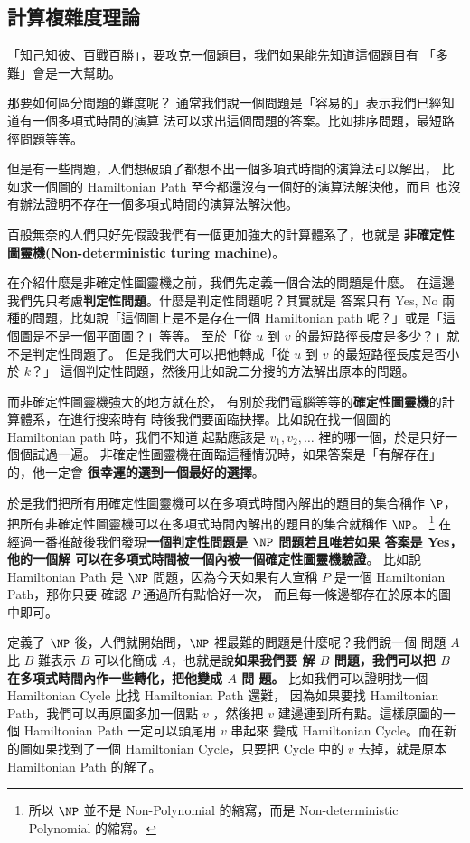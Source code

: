 \documentclass[a4paper,12pt]{book}
\begin{document}
\subsection{計算複雜度理論}
「知己知彼、百戰百勝」，要攻克一個題目，我們如果能先知道這個題目有
「多難」會是一大幫助。

那要如何區分問題的難度呢？
通常我們說一個問題是「容易的」表示我們已經知道有一個多項式時間的演算
法可以求出這個問題的答案。比如排序問題，最短路徑問題等等。

但是有一些問題，人們想破頭了都想不出一個多項式時間的演算法可以解出，
比如求一個圖的 Hamiltonian Path 至今都還沒有一個好的演算法解決他，而且
也沒有辦法證明不存在一個多項式時間的演算法解決他。

百般無奈的人們只好先假設我們有一個更加強大的計算體系了，也就是
{\bf 非確定性圖靈機(Non-deterministic turing machine)}。

在介紹什麼是非確定性圖靈機之前，我們先定義一個合法的問題是什麼。
在這邊我們先只考慮{\bf 判定性問題}。什麼是判定性問題呢？其實就是
答案只有 Yes, No 兩種的問題，比如說「這個圖上是不是存在一個 
Hamiltonian path 呢？」或是「這個圖是不是一個平面圖？」等等。
至於「從 $u$ 到 $v$ 的最短路徑長度是多少？」就不是判定性問題了。
但是我們大可以把他轉成「從 $u$ 到 $v$ 的最短路徑長度是否小於 $k$？」
這個判定性問題，然後用比如說二分搜的方法解出原本的問題。

而非確定性圖靈機強大的地方就在於，
有別於我們電腦等等的{\bf 確定性圖靈機}的計算體系，在進行搜索時有
時後我們要面臨抉擇。比如說在找一個圖的 Hamiltonian path 時，我們不知道
起點應該是 $v_1, v_2, \dots$ 裡的哪一個，於是只好一個個試過一遍。
非確定性圖靈機在面臨這種情況時，如果答案是「有解存在」的，他一定會
{\bf 很幸運的選到一個最好的選擇}。

於是我們把所有用確定性圖靈機可以在多項式時間內解出的題目的集合稱作
$\P$，把所有非確定性圖靈機可以在多項式時間內解出的題目的集合就稱作
$\NP$。%
\footnote{所以 $\NP$ 並不是 Non-Polynomial 的縮寫，而是
  Non-deterministic Polynomial 的縮寫。}
在經過一番推敲後我們發現{\bf 一個判定性問題是 $\NP$ 問題若且唯若如果
答案是 Yes，他的一個解 可以在多項式時間被一個內被一個確定性圖靈機驗證}。
比如說 Hamiltonian Path 是 $\NP$ 問題，因為今天如果有人宣稱 $P$ 是一個 
Hamiltonian Path，那你只要 確認 $P$ 通過所有點恰好一次，
而且每一條邊都存在於原本的圖中即可。

定義了 $\NP$ 後，人們就開始問，$\NP$ 裡最難的問題是什麼呢？我們說一個
問題 $A$ 比 $B$ 難表示 $B$ 可以化簡成 $A$，也就是說{\bf 如果我們要
  解 $B$ 問題，我們可以把 $B$ 在多項式時間內作一些轉化，把他變成 $A$ 問
  題。} 比如我們可以證明找一個 Hamiltonian Cycle 比找 Hamiltonian Path 還難，
因為如果要找 Hamiltonian Path，我們可以再原圖多加一個點 $v$ ，然後把 $v$ 
建邊連到所有點。這樣原圖的一個 Hamiltonian Path 一定可以頭尾用 $v$ 串起來
變成 Hamiltonian Cycle。而在新的圖如果找到了一個 Hamiltonian Cycle，只要把
Cycle 中的 $v$ 去掉，就是原本 Hamiltonian Path 的解了。
\end{document}
